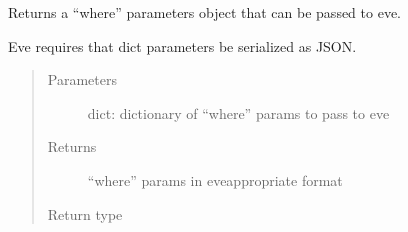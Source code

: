 \documentclass[letterpaper,10pt,english]{sphinxmanual}
\begin{document}
\begin{fulllineitems}
\label{\detokenize{autoapi/pine/backend/data/service/index:pine.backend.data.service.where_params}}
\sphinxAtStartPar
Returns a “where” parameters object that can be passed to eve.

\sphinxAtStartPar
Eve requires that dict parameters be serialized as JSON.
\begin{quote}\begin{description}
\item[{Parameters}] \leavevmode
\sphinxAtStartPar
{} \textendash{} dict: dictionary of “where” params to pass to eve

\item[{Returns}] \leavevmode
\sphinxAtStartPar
“where” params in eve\sphinxhyphen{}appropriate format

\item[{Return type}] \leavevmode
\sphinxAtStartPar
{}

\end{description}\end{quote}

\end{fulllineitems}

\end{document}
